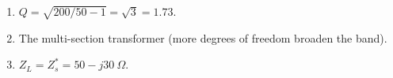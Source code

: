 \begin{enumerate}[leftmargin=1.6em,itemsep=2pt]
\item $Q = \sqrt{200/50 - 1} = \sqrt{3} = 1.73$.
\item The multi-section transformer (more degrees of freedom broaden the band).
\item $Z_L = Z_s^{*} = 50 - j30\ \Omega$.
\end{enumerate}
